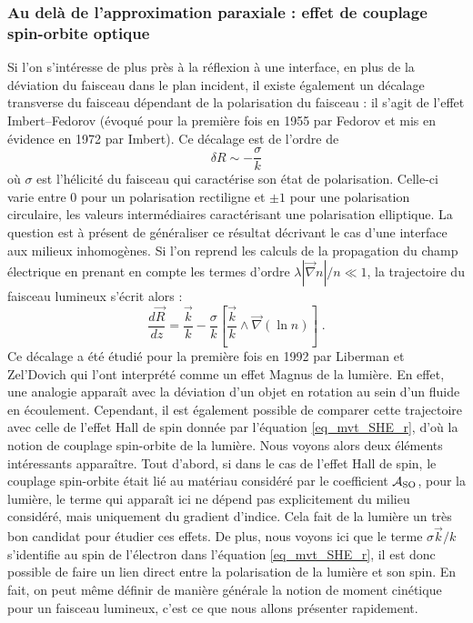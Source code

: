 \documentclass[a4paper,11pt]{article} %
\begin{document}
	\subsubsection{Au delà de l'approximation paraxiale : effet de couplage spin-orbite optique}
	
	Si l'on s'intéresse de plus près à la réflexion à une interface, en plus de la déviation du faisceau dans le plan incident, il existe également un décalage transverse du faisceau dépendant de la polarisation du faisceau : il s'agit de l'effet Imbert--Fedorov (évoqué pour la première fois en 1955 par Fedorov et mis en évidence en 1972 par Imbert). Ce décalage est de l'ordre de
	\begin{equation*}
		\delta R \sim - \frac{\sigma}{k}
	\end{equation*}
	où $ \sigma $ est l'hélicité du faisceau qui caractérise son état de polarisation. Celle-ci varie entre 0 pour un polarisation rectiligne et $\pm 1 $ pour une polarisation circulaire, les valeurs intermédiaires caractérisant une polarisation elliptique. La question est à présent de généraliser ce résultat décrivant le cas d'une interface aux milieux inhomogènes. Si l'on reprend les calculs de la propagation du champ électrique en prenant en compte les termes d'ordre $ \lambda | \vec{\nabla}n | / n \ll 1$, la trajectoire du faisceau lumineux s'écrit alors :
	\begin{equation}
		\frac{d \vec{R}}{dz} = \frac{\vec{k}}{k} - \frac{\sigma}{k} \left[ \frac{\vec{k}}{k} \wedge \vec{\nabla}(\ln n) \right] \; .
	\end{equation}
	Ce décalage a été étudié pour la première fois en 1992 par Liberman et Zel'Dovich qui l'ont interprété comme un effet Magnus de la lumière. En effet, une analogie apparaît avec la déviation d'un objet en rotation au sein d'un fluide en écoulement. Cependant, il est également possible de comparer cette trajectoire avec celle de l'effet Hall de spin donnée par l'équation \eqref{eq_mvt_SHE_r}, d'où la notion de couplage spin-orbite de la lumière. Nous voyons alors deux éléments intéressants apparaître. Tout d'abord, si dans le cas de l'effet Hall de spin, le couplage spin-orbite était lié au matériau considéré par le coefficient $ \mathcal{A}_\textup{SO} $, pour la lumière, le terme qui apparaît ici ne dépend pas explicitement du milieu considéré, mais uniquement du gradient d'indice. Cela fait de la lumière un très bon candidat pour étudier ces effets. De plus, nous voyons ici que le terme $ \sigma \vec{k} /k $ s'identifie au spin de l'électron dans l'équation \eqref{eq_mvt_SHE_r}, il est donc possible de faire un lien direct entre la polarisation de la lumière et son spin. En fait, on peut même définir de manière générale la notion de moment cinétique pour un faisceau lumineux, c'est ce que nous allons présenter rapidement.
	
\end{document}

